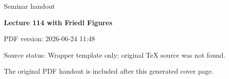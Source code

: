 \documentclass[11pt,a4paper]{article}
\newcommand{\seminartitle}{Lecture 114 with Friedl Figures}
\newcommand{\seminarsubtitle}{Seminar handout}
\newcommand{\seminardate}{2026-06-24 11:48}
\newcommand{\seminarsourcestatus}{Wrapper template only; original TeX source was not found.}
\begin{document}
\begin{titlepage}
\thispagestyle{empty}
\vspace*{0.16\textheight}
{\Large\color{seminarblue}\seminarsubtitle\par}
\vspace{1.5em}
{\LARGE\bfseries \seminartitle\par}
\vspace{2em}
{\large PDF version: \seminardate\par}
\vfill
{\small Source status: \seminarsourcestatus\par}
\vspace{1em}
{\small The original PDF handout is included after this generated cover page.\par}
\end{titlepage}

\clearpage
\hypersetup{pageanchor=false}

\end{document}
